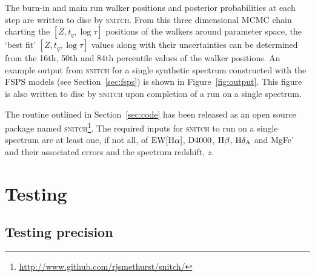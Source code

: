 \documentclass[useAMS,usenatbib]{mn2e}
\begin{document}
The burn-in and main run walker positions and posterior probabilities at each step are written to disc by \textsc{snitch}. From this three dimensional MCMC chain charting the $[Z, t_q, \log \tau]$ positions of the walkers around parameter space, the `best fit' $[Z, t_q, \log \tau]$ values along with their uncertainties can be determined from the 16th, 50th and 84th percentile values of the walker positions. An example output from \textsc{snitch} for a single synthetic spectrum constructed with the FSPS models (see Section~\ref{sec:fsps}) is shown in Figure~\ref{fig:output}. This figure is also written to disc by \textsc{snitch} upon completion of a run on a single spectrum.  


The routine outlined in Section~\ref{sec:code} has been released as an open source package named \textsc{snitch}\footnote{\url{http://www.github.com/rjsmethurst/snitch/}}. The required inputs for \textsc{snitch} to run on a single spectrum are at least one, if not all, of $\rm{EW}[H\alpha]$, $\rm{D}4000$, $\rm{H}\beta$, $\rm{H}\delta_A$ and MgFe' and their associated errors and the spectrum redshift, $z$. 

\section{Testing}\label{sec:test}

\subsection{Testing precision}\label{sec:precisiontest}

\end{document}
